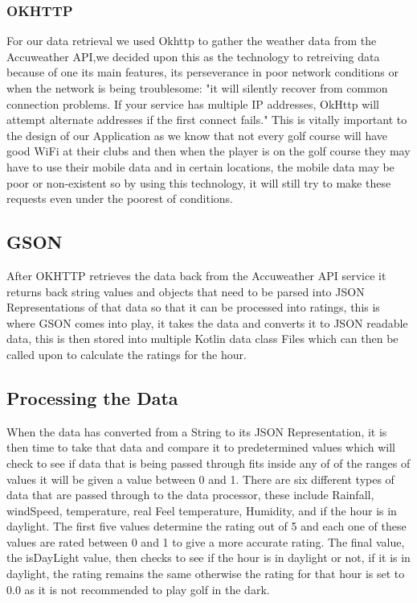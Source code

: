 \subsubsection{OKHTTP}
For our data retrieval we used Okhttp to gather the weather data from the Accuweather API,we decided upon this as the technology to retreiving data because of one its main features, its perseverance in poor network conditions or when the network is being troublesome: "it will silently recover from common connection problems. If your service has multiple IP addresses, OkHttp will attempt alternate addresses if the first connect fails."\cite{ref1}
\newline
\newline
This is vitally important to the design of our Application as we know that not every golf course will have good WiFi at their clubs and then when the player is on the golf course they may have to use their mobile data and in certain locations, the mobile data may be poor or non-existent so by using this technology, it will still try to make these requests even under the poorest of conditions.

\subsection{GSON}
After OKHTTP retrieves the data back from the Accuweather API service it returns back string values and objects that need to be parsed into JSON Representations of that data so that it can be processed into ratings, this is where GSON comes into play, it takes the data and converts it to JSON readable data, this is then stored into multiple Kotlin data class Files which can then be called upon to calculate the ratings for the hour.

\subsection {Processing the Data}
When the data has converted from a String to its JSON Representation, it is then time to take that data and compare it to predetermined values which will check to see if data that is being passed through fits inside any of of the ranges of values it will be given a value between 0 and 1.
\newline
\newline
There are six different types of data that are passed through to the data processor, these include Rainfall, windSpeed, temperature, real Feel temperature, Humidity, and if the hour is in daylight. The first five values determine the rating out of 5 and each one of these values are rated between 0 and 1 to give a more accurate rating. The final value, the isDayLight value, then checks to see if the hour is in daylight or not, if it is in daylight, the rating remains the same otherwise the rating for that hour is set to 0.0 as it is not recommended to play golf in the dark.

